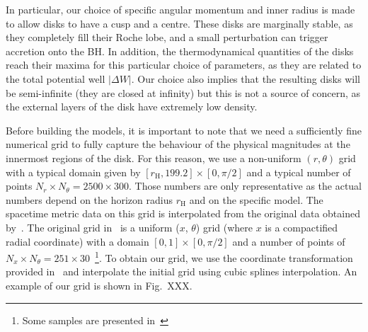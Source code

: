 \documentclass[twocolumn,aps,showpacs,showkeys,prd,superscriptaddress,byrevtex, amsmath]{revtex4-1}
\begin{document}
In particular, our choice of specific angular momentum and inner radius is made to allow disks to have a cusp and a centre. These disks are marginally stable, as they completely fill their Roche lobe, and a small perturbation can trigger accretion onto the BH. In addition, the thermodynamical quantities of the disks reach their maxima for this particular choice of parameters, as they are related to the total potential well $|\Delta W|$. Our choice also implies that the resulting disks will be semi-infinite (they are closed at infinity) but this is not a source of concern, as the external layers of the disk have extremely low density.

Before building the models, it is important to note that we need a sufficiently fine numerical grid to fully capture the behaviour of the physical magnitudes at the innermost regions of the disk. For this reason, we use a non-uniform $(r, \theta)$ grid with a typical domain given by $[r_{\mathrm{H}}, 199.2] \times [0, \pi/2]$ and a typical number of points $N_r \times N_{\theta} = 2500 \times 300$. Those numbers are only representative as the actual numbers depend on the horizon radius $r_{\mathrm{H}}$ and on the specific model. The spacetime metric data on this grid is interpolated from the original data obtained by~\cite{Herdeiro:2015b}. The original grid in~\cite{Herdeiro:2015b} is a uniform ($x$, $\theta$) grid (where $x$ is a compactified radial coordinate) with a domain $[0, 1] \times [0, \pi/2]$ and a number of points of $N_x \times N_{\theta} = 251 \times 30$~\footnote{Some samples are presented in~\cite{grav_web}}. To obtain our grid, we use the coordinate transformation provided in~\cite{grav_web} and interpolate the initial grid using cubic splines interpolation. An example of our grid is shown in Fig.~XXX. 
\end{document}
